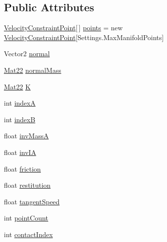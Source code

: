 \subsection*{Public Attributes}
\begin{DoxyCompactItemize}
\item 
\hyperlink{class_farseer_physics_1_1_dynamics_1_1_contacts_1_1_velocity_constraint_point}{Velocity\+Constraint\+Point}\mbox{[}$\,$\mbox{]} \hyperlink{class_farseer_physics_1_1_dynamics_1_1_contacts_1_1_contact_velocity_constraint_aacb753b4b6bd21135b82a0132e99afed}{points} = new \hyperlink{class_farseer_physics_1_1_dynamics_1_1_contacts_1_1_velocity_constraint_point}{Velocity\+Constraint\+Point}\mbox{[}Settings.\+Max\+Manifold\+Points\mbox{]}
\item 
Vector2 \hyperlink{class_farseer_physics_1_1_dynamics_1_1_contacts_1_1_contact_velocity_constraint_aee7f3a91d3ad6195bc7ad7aa065aac07}{normal}
\item 
\hyperlink{struct_farseer_physics_1_1_common_1_1_mat22}{Mat22} \hyperlink{class_farseer_physics_1_1_dynamics_1_1_contacts_1_1_contact_velocity_constraint_a36d97b5605ee3af83e57411cbc1e9f8e}{normal\+Mass}
\item 
\hyperlink{struct_farseer_physics_1_1_common_1_1_mat22}{Mat22} \hyperlink{class_farseer_physics_1_1_dynamics_1_1_contacts_1_1_contact_velocity_constraint_a11a55196552d51a6a7fe19a616481a95}{K}
\item 
int \hyperlink{class_farseer_physics_1_1_dynamics_1_1_contacts_1_1_contact_velocity_constraint_a04a0ef078a0cc2c5260075cff711beed}{index\+A}
\item 
int \hyperlink{class_farseer_physics_1_1_dynamics_1_1_contacts_1_1_contact_velocity_constraint_abe486674e8a0915a0528adcf6fed320d}{index\+B}
\item 
float \hyperlink{class_farseer_physics_1_1_dynamics_1_1_contacts_1_1_contact_velocity_constraint_a2c02963a6924920fba2f5b382c5438c4}{inv\+Mass\+A}
\item 
float \hyperlink{class_farseer_physics_1_1_dynamics_1_1_contacts_1_1_contact_velocity_constraint_a4858752e7692294c466708deaf25b10c}{inv\+I\+A}
\item 
float \hyperlink{class_farseer_physics_1_1_dynamics_1_1_contacts_1_1_contact_velocity_constraint_afcfea28c14fb528b6bcf647048cc115c}{friction}
\item 
float \hyperlink{class_farseer_physics_1_1_dynamics_1_1_contacts_1_1_contact_velocity_constraint_a845f910afcaaaf1c6820c7049908e96b}{restitution}
\item 
float \hyperlink{class_farseer_physics_1_1_dynamics_1_1_contacts_1_1_contact_velocity_constraint_ae926793d7f81b828c9c334568c3d8fe6}{tangent\+Speed}
\item 
int \hyperlink{class_farseer_physics_1_1_dynamics_1_1_contacts_1_1_contact_velocity_constraint_aa90737db3d747cf8a416de8fa88e5036}{point\+Count}
\item 
int \hyperlink{class_farseer_physics_1_1_dynamics_1_1_contacts_1_1_contact_velocity_constraint_a711e94094f519d6efe41d0c174cf6bae}{contact\+Index}
\end{DoxyCompactItemize}


